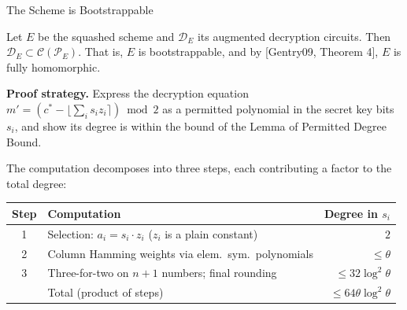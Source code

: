 \documentclass[10pt]{beamer}
\begin{document}
\begin{frame}{The Scheme is Bootstrappable}
    \begin{theorem}
    Let $E$ be the squashed scheme and $\mathcal{D}_E$ its augmented
    decryption circuits. Then $\mathcal{D}_E \subset \mathcal{C}(\mathcal{P}_E)$.
    That is, $E$ is bootstrappable, and by [Gentry09, Theorem 4], $E$ is fully
    homomorphic.
    \end{theorem}
    \pause

    \vspace{0.3cm}
    \textbf{Proof strategy.}
    Express the decryption equation
    $m' = (c^* - \lfloor\sum_i s_i z_i\rceil) \bmod 2$
    as a permitted polynomial in the secret key bits $s_i$, and show its
    degree is within the bound of the Lemma of Permitted Degree Bound.

    \vspace{0.3cm}
    The computation decomposes into three steps, each contributing a factor
    to the total degree:

    \vspace{0.2cm}
    \begin{center}
    \renewcommand{\arraystretch}{1.3}
    \begin{tabular}{clr}
        \hline
        \textbf{Step} & \textbf{Computation} & \textbf{Degree in $s_i$} \\
        \hline
        1 & Selection:\; $a_i = s_i \cdot z_i$ \quad($z_i$ is a plain constant) & $2$ \\
        2 & Column Hamming weights via elem.\ sym.\ polynomials & $\leq\theta$ \\
        3 & Three-for-two on $n{+}1$ numbers; final rounding & $\leq 32\log^2\!\theta$ \\
        \hline
        & Total (product of steps) & $\leq 64\theta\log^2\!\theta$ \\
        \hline
    \end{tabular}
    \end{center}
\end{frame}



\end{document}
